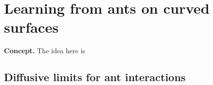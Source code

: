 \chapter{\sffamily Learning from ants on curved surfaces}

{\bfseries\sffamily Concept.} The idea here is 

\section{\sffamily Diffusive limits for ant interactions}
